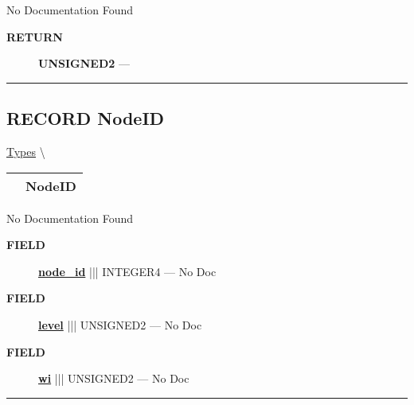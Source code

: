 No Documentation Found








\par
\begin{description}
\item [\colorbox{tagtype}{\color{white} \textbf{\textsf{RETURN}}}] \textbf{UNSIGNED2} --- 
\end{description}




\rule{\linewidth}{0.5pt}
\subsection*{\textsf{\colorbox{headtoc}{\color{white} RECORD}
NodeID}}

\hypertarget{ecldoc:ml_core.types.nodeid}{}
\hspace{0pt} \hyperlink{ecldoc:ML_Core.Types}{Types} \textbackslash 

{\renewcommand{\arraystretch}{1.5}
\begin{tabularx}{\textwidth}{|>{\raggedright\arraybackslash}l|X|}
\hline
\hspace{0pt}\mytexttt{\color{red} } & \textbf{NodeID} \\
\hline
\end{tabularx}
}

\par





No Documentation Found







\par
\begin{description}
\item [\colorbox{tagtype}{\color{white} \textbf{\textsf{FIELD}}}] \textbf{\underline{node\_id}} ||| INTEGER4 --- No Doc
\item [\colorbox{tagtype}{\color{white} \textbf{\textsf{FIELD}}}] \textbf{\underline{level}} ||| UNSIGNED2 --- No Doc
\item [\colorbox{tagtype}{\color{white} \textbf{\textsf{FIELD}}}] \textbf{\underline{wi}} ||| UNSIGNED2 --- No Doc
\end{description}





\rule{\linewidth}{0.5pt}


